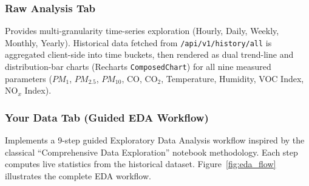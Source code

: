 \documentclass[12pt,a4paper]{article}
\begin{document}
\subsubsection{Raw Analysis Tab}
Provides multi-granularity time-series exploration (Hourly, Daily, Weekly, Monthly, Yearly). Historical data fetched from \texttt{/api/v1/history/all} is aggregated client-side into time buckets, then rendered as dual trend-line and distribution-bar charts (Recharts \texttt{ComposedChart}) for all nine measured parameters ($PM_1$, $PM_{2.5}$, $PM_{10}$, CO, CO$_2$, Temperature, Humidity, VOC Index, NO$_x$ Index).

\subsubsection{Your Data Tab (Guided EDA Workflow)}
Implements a 9-step guided Exploratory Data Analysis workflow inspired by the classical ``Comprehensive Data Exploration'' notebook methodology. Each step computes live statistics from the historical dataset. Figure~\ref{fig:eda_flow} illustrates the complete EDA workflow.
\end{document}
